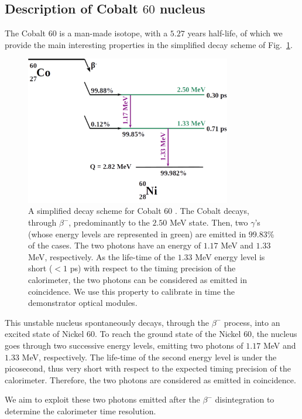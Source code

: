 \subsection{Description of Cobalt $60$ nucleus}
\label{subsec:CoSource}
The Cobalt $60$ is a man-made isotope, with a $5.27$ years half-life, of which we provide the main interesting properties in the simplified decay scheme of Fig.~\ref{fig:Co_decay_scheme}.
\begin{figure}[h]
  \centering
  \includegraphics[width=9cm]{commissioning/fig_commissioning/Co_decay_scheme.pdf}
  \caption{A simplified decay scheme for Cobalt $60$ \cite{web:nucleide}.
    The Cobalt decays, through $\beta^{-}$, predominantly to the $2.50$ MeV state.
    Then, two $\gamma$'s (whose energy levels are represented in green) are emitted in $99.83$\% of the cases.
    The two photons have an energy of $1.17$ MeV and $1.33$ MeV, respectively.
    As the life-time of the $1.33$ MeV energy level is short ($<1$ ps) with respect to the timing precision of the calorimeter, the two photons can be considered as emitted in coincidence.
    We use this property to calibrate in time the demonstrator optical modules.
    \label{fig:Co_decay_scheme}}
\end{figure}
This unstable nucleus spontaneously decays, through the $\beta^{-}$ process, into an excited state of Nickel $60$.
To reach the ground state of the Nickel $60$, the nucleus goes through two successive energy levels, emitting two photons of $1.17$ MeV and $1.33$ MeV, respectively.
The life-time of the second energy level is under the picosecond, thus very short with respect to the expected timing precision of the calorimeter.
Therefore, the two photons are considered as emitted in coincidence.

We aim to exploit these two photons emitted after the $\beta^{-}$ disintegration to determine the calorimeter time resolution.

